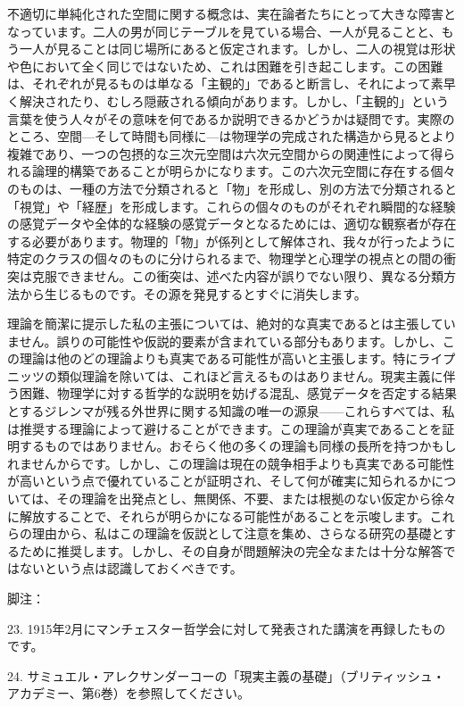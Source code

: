 \documentclass[a4paper,11pt,openany]{ltjsbook}
\begin{document}
不適切に単純化された空間に関する概念は、実在論者たちにとって大きな障害となっています。二人の男が同じテーブルを見ている場合、一人が見ることと、もう一人が見ることは同じ場所にあると仮定されます。しかし、二人の視覚は形状や色において全く同じではないため、これは困難を引き起こします。この困難は、それぞれが見るものは単なる「主観的」であると断言し、それによって素早く解決されたり、むしろ隠蔽される傾向があります。しかし、「主観的」という言葉を使う人々がその意味を何であるか説明できるかどうかは疑問です。実際のところ、空間—そして時間も同様に—は物理学の完成された構造から見るとより複雑であり、一つの包摂的な三次元空間は六次元空間からの関連性によって得られる論理的構築であることが明らかになります。この六次元空間に存在する個々のものは、一種の方法で分類されると「物」を形成し、別の方法で分類されると「視覚」や「経歴」を形成します。これらの個々のものがそれぞれ瞬間的な経験の感覚データや全体的な経験の感覚データとなるためには、適切な観察者が存在する必要があります。物理的「物」が係列として解体され、我々が行ったように特定のクラスの個々のものに分けられるまで、物理学と心理学の視点との間の衝突は克服できません。この衝突は、述べた内容が誤りでない限り、異なる分類方法から生じるものです。その源を発見するとすぐに消失します。

理論を簡潔に提示した私の主張については、絶対的な真実であるとは主張していません。誤りの可能性や仮説的要素が含まれている部分もあります。しかし、この理論は他のどの理論よりも真実である可能性が高いと主張します。特にライプニッツの類似理論を除いては、これほど言えるものはありません。現実主義に伴う困難、物理学に対する哲学的な説明を妨げる混乱、感覚データを否定する結果とするジレンマが残る外世界に関する知識の唯一の源泉——これらすべては、私は推奨する理論によって避けることができます。この理論が真実であることを証明するものではありません。おそらく他の多くの理論も同様の長所を持つかもしれませんからです。しかし、この理論は現在の競争相手よりも真実である可能性が高いという点で優れていることが証明され、そして何が確実に知られるかについては、その理論を出発点とし、無関係、不要、または根拠のない仮定から徐々に解放することで、それらが明らかになる可能性があることを示唆します。これらの理由から、私はこの理論を仮説として注意を集め、さらなる研究の基礎とするために推奨します。しかし、その自身が問題解決の完全なまたは十分な解答ではないという点は認識しておくべきです。

脚注：

23. 1915年2月にマンチェスター哲学会に対して発表された講演を再録したものです。

24. サミュエル・アレクサンダーコーの「現実主義の基礎」（ブリティッシュ・アカデミー、第6巻）を参照してください。
\end{document}
